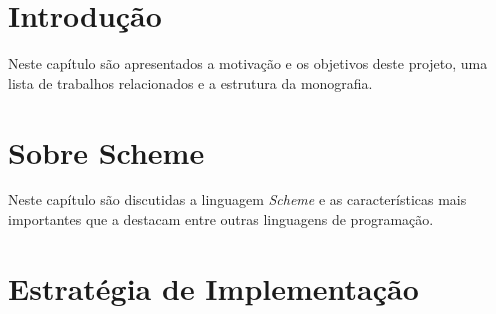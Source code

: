 \documentclass[brazil,pagestart=firstchapter]{abnt}
\begin{document}
\tableofcontents


\chapter{Introdução}
\label{cap:introducao}


\vfill{}
\vfill{}

Neste capítulo são apresentados a motivação e os objetivos deste projeto, uma
lista de trabalhos relacionados e a estrutura da monografia.
\newpage






\chapter{Sobre Scheme}
\label{cap:scheme}

\vfill{}
\vfill{}

Neste capítulo são discutidas a linguagem \textit{Scheme} e as características
mais importantes que a destacam entre outras linguagens de programação.
\newpage






\chapter{Estratégia de Implementação}
\label{cap:estrategia}

\vfill{}
\vfill{}
\end{document}
